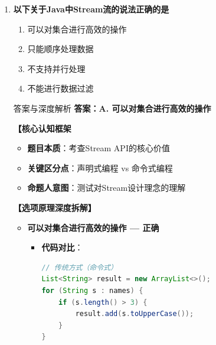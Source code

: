 \documentclass[12pt, a4paper]{ctexart}
\begin{document}
\begin{enumerate}[label=\textbf{\arabic*.}]
\begin{bluebox}{答案与深度解析}
		      \textbf{【应背诵知识点}
		      \begin{itemize}[label={}, nosep]
			      \item 方法引用：Lambda的简洁写法
			      \item 四种类型：静态方法、实例方法、类实例方法、构造器
			      \item 语法：ClassName::method 或 object::method
			      \item 优势：减少代码量、提高可读性
		      \end{itemize}

		      \textbf{【命题趋势与实战策略】}

		      \textbf{考场秒杀}：看到"不能引用静态方法"→必错，方法引用完全支持静态方法
	      \end{bluebox}

	      \vspace{1em}

	\item \textbf{以下关于Java中Stream流的说法正确的是}
	      \begin{enumerate}[label=\Alph*.]
		      \item 可以对集合进行高效的操作
		      \item 只能顺序处理数据
		      \item 不支持并行处理
		      \item 不能进行数据过滤
	      \end{enumerate}

	      \begin{bluebox}{答案与深度解析}
		      \textbf{答案：A. 可以对集合进行高效的操作}

		      \textbf{【核心认知框架}
		      \begin{itemize}[label={}, leftmargin=*, nosep]
			      \item \textbf{题目本质}：考查Stream API的核心价值
			      \item \textbf{关键区分点}：声明式编程 vs 命令式编程
			      \item \textbf{命题人意图}：测试对Stream设计理念的理解
		      \end{itemize}

		      \textbf{【选项原理深度拆解】}

		      \begin{itemize}[leftmargin=*, nosep, label={}]
			      \item[A] \textbf{可以对集合进行高效的操作 — 正确}
			            \begin{itemize}[label={}, leftmargin=*, nosep]
				            \item \textbf{代码对比}：
				                  \begin{lstlisting}[language=Java]
// 传统方式（命令式）
List<String> result = new ArrayList<>();
for (String s : names) {
    if (s.length() > 3) {
        result.add(s.toUpperCase());
    }
}


\end{lstlisting}
\end{itemize}
\end{itemize}
\end{bluebox}
\end{enumerate}
\end{document}
